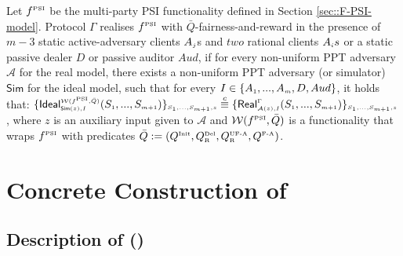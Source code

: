  \vspace{-1mm}
\begin{definition}[\ep]\label{def::PSI-Q-fair-reward}
Let $f^{\scriptscriptstyle \text{PSI}}$ be the multi-party PSI functionality defined in Section \ref{sec::F-PSI-model}. Protocol $\Gamma$ realises  $f^{\scriptscriptstyle \text{PSI}}$ with $\bar Q$-fairness-and-reward in the presence of $m-3$ static active-adversary clients $A_{\scriptscriptstyle j}$s and $two$ rational clients $A_{\scriptscriptstyle i}s$ or a static passive dealer  $D$ or passive auditor $Aud$, if for every non-uniform PPT adversary $\mathcal{A}$ for the real model, there exists a non-uniform PPT adversary (or simulator) $\mathsf{Sim}$ for the ideal model, such that for every $I\in \{A_{\scriptscriptstyle 1},...,A_{\scriptscriptstyle m}, D, Aud\}$, it holds that: 
$\{\mathsf {Ideal}^{\scriptscriptstyle \mathcal{W}(f^{\scriptscriptstyle \text{PSI}}, \bar Q)}_{\scriptscriptstyle \mathsf{Sim}(z), I}(S_{\scriptscriptstyle 1},..., S_{\scriptscriptstyle m+1})\}_{\scriptscriptstyle S_{\scriptscriptstyle 1},..., S_{\scriptscriptstyle m+1},z}\stackrel{c}{\equiv} \{\mathsf{Real}_{\scriptscriptstyle \mathcal{A}(z), I}^{\scriptscriptstyle \Gamma}(S_{\scriptscriptstyle 1}\\,..., S_{\scriptscriptstyle m+1}) \}_{\scriptscriptstyle S_{\scriptscriptstyle 1},..., S_{\scriptscriptstyle m+1},z}$, 
where  $z$ is an auxiliary input given to $\mathcal{A}$ and  $\mathcal{W}(f^{\scriptscriptstyle \text{PSI}}, \bar Q)$ is a functionality that wraps $f^{\scriptscriptstyle \text{PSI}}$ with predicates $\bar Q:=(Q^{\scriptscriptstyle \text{Init}},  Q^{\scriptscriptstyle \text{Del}}_{\scriptscriptstyle\text{R}}, Q^{\scriptscriptstyle \text{UF-A}}_{\scriptscriptstyle \text{R}}, Q^{\scriptscriptstyle \text{F-A}})$. 
  \end{definition}




 \vspace{-2mm}
\section{Concrete Construction of \ep}

 \vspace{-3mm}
 





\subsection{Description of \withRew (\epsi)}
 \vspace{-1mm}

